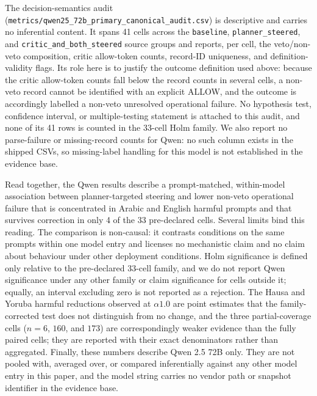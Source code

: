 The decision-semantics audit
(\texttt{metrics/qwen25\_72b\_primary\_canonical\_audit.csv}) is descriptive and
carries no inferential content. It spans 41 cells across the \texttt{baseline},
\texttt{planner\_steered}, and \texttt{critic\_and\_both\_steered} source groups
and reports, per cell, the veto/non-veto composition, critic allow-token counts,
record-ID uniqueness, and definition-validity flags. Its role here is to justify
the outcome definition used above: because the critic allow-token counts fall
below the record counts in several cells, a non-veto record cannot be identified
with an explicit ALLOW, and the outcome is accordingly labelled a non-veto
unresolved operational failure. No hypothesis test, confidence interval, or
multiple-testing statement is attached to this audit, and none of its 41 rows is
counted in the 33-cell Holm family. We also report no parse-failure or
missing-record counts for Qwen: no such column exists in the shipped CSVs, so
missing-label handling for this model is not established in the evidence base.

Read together, the Qwen results describe a prompt-matched, within-model
association between planner-targeted steering and lower non-veto operational
failure that is concentrated in Arabic and English harmful prompts and that
survives correction in only 4 of the 33 pre-declared cells. Several limits bind
this reading. The comparison is non-causal: it contrasts conditions on the same
prompts within one model entry and licenses no mechanistic claim and no claim
about behaviour under other deployment conditions. Holm significance is defined
only relative to the pre-declared 33-cell family, and we do not report Qwen
significance under any other family or claim significance for cells outside it;
equally, an interval excluding zero is not reported as a rejection. The Hausa
and Yoruba harmful reductions observed at $\alpha1.0$ are point estimates that
the family-corrected test does not distinguish from no change, and the three
partial-coverage cells ($n = 6$, $160$, and $173$) are correspondingly weaker
evidence than the fully paired cells; they are reported with their exact
denominators rather than aggregated. Finally, these numbers describe Qwen 2.5
72B only. They are not pooled with, averaged over, or compared inferentially
against any other model entry in this paper, and the model string carries no
vendor path or snapshot identifier in the evidence base.

